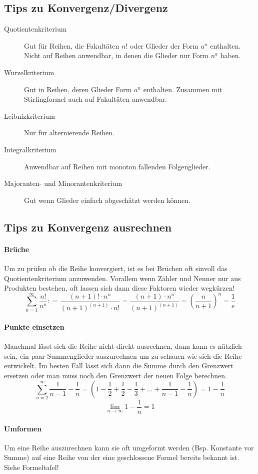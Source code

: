 \subsection{Tips zu Konvergenz/Divergenz}
\vspace{-0.2cm}
\begin{description}
	\item [Quotientenkriterium] Gut für Reihen, die Fakultäten $n!$ oder Glieder der Form $a^n$ enthalten. Nicht auf Reihen anwendbar, in denen die Glieder nur Form $n^a$ haben.

	\item [Wurzelkriterium] Gut in Reihen, deren Glieder Form $a^n$ enthalten. Zusammen mit Stirlingformel auch auf Fakultäten anwendbar.

	\item [Leibnizkriterium] Nur für alternierende Reihen.

	\item [Integralkriterium] Anwendbar auf Reihen mit monoton fallenden Folgenglieder.

	\item [Majoranten- und Minorantenkriterium] Gut wenn Glieder einfach abgeschätzt werden können.
\end{description}

\subsection{Tips zu Konvergenz ausrechnen}
\paragraph{Brüche}
\vspace{-0.2cm}
Um zu prüfen ob die Reihe konvergiert, ist es bei Brüchen oft sinvoll das Quotientenkriterium anzuwenden. Vorallem wenn Zähler und Nenner nur aus Produkten bestehen, oft lassen sich dann diese Faktoren wieder wegkürzen!
\[
	\sum_{n=1}^\infty \frac{n!}{n^n}: = \frac{(n+1)! \cdot n^n}{(n+1)^{(n+1)} \cdot n!} 
	= \frac{(n+1) \cdot n^n}{(n+1)^{(n+1)}} = \left( \frac{n}{n+1} \right)^n = \frac{1}{e}
\]

\paragraph{Punkte einsetzen}
\vspace{-0.2cm}
Manchmal lässt sich die Reihe nicht direkt ausrechnen, dann kann es nützlich sein, ein paar Summenglieder auszurechnen um zu schauen wie sich die Reihe entwickelt. Im besten Fall lässt sich dann die Summe durch den Grenzwert ersetzen oder man muss noch den Grenzwert der neuen Folge berechnen. 
\[
	\sum_{n=2}^\infty \frac{1}{n-1} - \frac{1}{n} = \left( 1 - \frac{1}{2} + \frac{1}{2} - \frac{1}{3} + \ldots + \frac{1}{n-1} - \frac{1}{n} \right) = 1 - \frac{1}{n}
\]
\[
	\lim_{n \to \infty} 1 - \frac{1}{n} = 1
\]

\paragraph{Umformen}
\vspace{-0.2cm}
Um eine Reihe auszurechnen kann sie oft umgeformt werden (Bsp. Konstante vor Summe) auf eine Reihe von der eine geschlossene Formel bereits bekannt ist. Siehe Formeltafel!